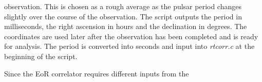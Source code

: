 \documentclass[a4paper,12pt]{article}
\begin{document}
observation. This is chosen as a rough average as the pulsar period changes slightly over the course of the observation. The script outputs the period in milliseconds, the right ascension in hours and the declination in degrees. The coordinates are used later after the observation has been completed and is ready for analysis. The period is converted into seconds and input into \emph{rtcorr.c} at the beginning of the script.

                                                                                                                                                                                                                                                                                                                                                                                                                                                                                                                                                                                                                                                                                                                                                                                                                                                                                                                                                                                                                                                                                                                                                                                                                                                                                                                                                                                                                                                                                                                                                                                                                                                                                                                                                                                                                                                                                                                                                                                                                                                                                                                                                                                                                                                                                                                                                                                                                                                                                                                                                                                                                                                                                                                                                                                                                                                                                       Since the EoR correlator requires different inputs from the 
\end{document}
